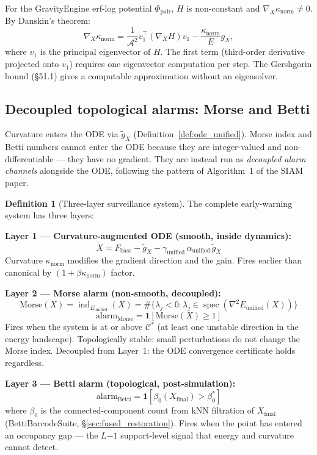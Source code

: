 \documentclass[11pt,a4paper]{article}
\theoremstyle{definition}
\newtheorem{definition}[theorem]{Definition}
\newcommand{\Fbase}{F_{\mathrm{base}}}
\begin{document}
For the GravityEngine erf-log potential $\Phi_\mathrm{pair}$,
$H$ is non-constant and $\nabla_X\kappa_\mathrm{norm} \neq 0$.
By Danskin's theorem:
\[
\nabla_X\kappa_\mathrm{norm} =
\frac{1}{\mathcal{A}^2}v_1^\top(\nabla_X H)v_1
- \frac{\kappa_\mathrm{norm}}{E}g_X,
\]
where $v_1$ is the principal eigenvector of $H$.
The first term (third-order derivative projected onto $v_1$)
requires one eigenvector computation per step.
The Gershgorin bound (§51.1) gives a computable approximation
without an eigensolver.

\subsection{Decoupled topological alarms: Morse and Betti}
\label{sec:decoupled_alarms}

Curvature enters the ODE via $\tilde g_X$ (Definition~\ref{def:ode_unified}).
Morse index and Betti numbers cannot enter the ODE because they are
integer-valued and non-differentiable --- they have no gradient.
They are instead run as \emph{decoupled alarm channels} alongside the ODE,
following the pattern of Algorithm~1 of the SIAM paper.

\begin{definition}[Three-layer surveillance system]
\label{def:three_layer}
The complete early-warning system has three layers:

\medskip
\noindent\textbf{Layer 1 — Curvature-augmented ODE (smooth, inside dynamics):}
\[
\dot X = \Fbase - \tilde g_X - \gamma_\mathrm{unified}\,\alpha_\mathrm{unified}\,\tilde g_X
\]
Curvature $\kappa_\mathrm{norm}$ modifies the gradient direction and the gain.
Fires earlier than canonical by $(1+\beta\kappa_\mathrm{norm})$ factor.

\medskip
\noindent\textbf{Layer 2 — Morse alarm (non-smooth, decoupled):}
\[
\mathrm{Morse}(X) = \operatorname{ind}_{E_\mathrm{unified}}(X)
= \#\{\lambda_j < 0 : \lambda_j \in \operatorname{spec}(\nabla^2 E_\mathrm{unified}(X))\}
\]
\[
\mathrm{alarm}_\mathrm{Morse} = \mathbf{1}[\mathrm{Morse}(X) \geq 1]
\]
Fires when the system is at or above $\mathcal{C}^*$
(at least one unstable direction in the energy landscape).
Topologically stable: small perturbations do not change the Morse index.
Decoupled from Layer~1: the ODE convergence certificate holds regardless.

\medskip
\noindent\textbf{Layer 3 — Betti alarm (topological, post-simulation):}
\[
\mathrm{alarm}_\mathrm{Betti} = \mathbf{1}[\beta_0(X_\mathrm{final}) > \beta_0^*]
\]
where $\beta_0$ is the connected-component count from
kNN filtration of $X_\mathrm{final}$
(BettiBarcodeSuite, §\ref{sec:fused_restoration}).
Fires when the point has entered an occupancy gap ---
the $L{-1}$ support-level signal that energy and curvature cannot detect.
\end{definition}
\end{document}
